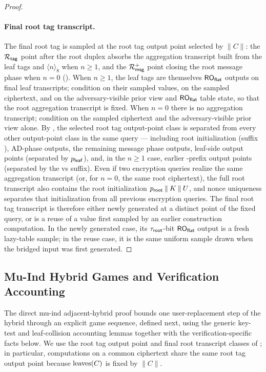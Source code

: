 \begin{proof}
\paragraph{Final root tag transcript.}
The final root tag is sampled at the root tag output point selected by
$\|C\|$: the $\mathcal{R}_{\mathsf{tag}}$ point after the root duplex absorbs the
aggregation transcript built from the leaf tags and $\langle n
\rangle_8$ when $n \geq 1$, and the $\mathcal{R}_{\mathsf{msg}}^+$ point closing the root
message phase when $n = 0$ (). When $n \geq 1$, the leaf
tags are themselves $\mathsf{RO}_{\mathsf{flat}}$ outputs on final leaf transcripts;
condition on their sampled values, on the sampled
ciphertext, and on the adversary-visible prior view and $\mathsf{RO}_{\mathsf{flat}}$
table state, so that the root aggregation transcript is fixed. When
$n = 0$ there is no aggregation transcript; condition on the sampled
ciphertext and the adversary-visible prior view alone. By
, the selected root tag output-point class is
separated from every other output-point class in the same query ---
including root initialization (suffix \siginit), AD-phase outputs,
the remaining message phase outputs, leaf-side output points (separated
by $p_{\mathsf{leaf}}$), and, in the $n \geq 1$ case, earlier \Ragg-prefix
output points (separated by the \sigaggmore vs
\sigagglast suffix). Even if two encryption queries realize
the same aggregation transcript (or, for $n = 0$, the same root
ciphertext), the full root transcript also
contains the root initialization $p_{\mathsf{root}} \mathbin{\|} K
\mathbin{\|} U$, and nonce uniqueness separates that initialization from
all previous encryption queries. The final root tag transcript is
therefore either newly generated at a distinct point of the fixed query,
or is a reuse of a value first sampled by an earlier construction
computation. In the newly generated case, its $\tau_{\mathsf{root}}$-bit $\mathsf{RO}_{\mathsf{flat}}$
output is a fresh lazy-table sample; in the reuse case, it is the same
uniform sample drawn when the bridged input was first generated.
\end{proof}

\subsection{Mu-Ind Hybrid Games and Verification Accounting}
\label{app:mu-verification-coupling}

The direct mu-ind adjacent-hybrid proof bounds one user-replacement step
of the hybrid through an explicit game sequence, defined next, using the
generic key-test and leaf-collision accounting lemmas together with the
verification-specific facts below. We use the root tag output point and
final root transcript classes of ; in
particular, computations on a common ciphertext share the same root tag
output point because $\operatorname{leaves}(C)$ is fixed by $\|C\|$.

